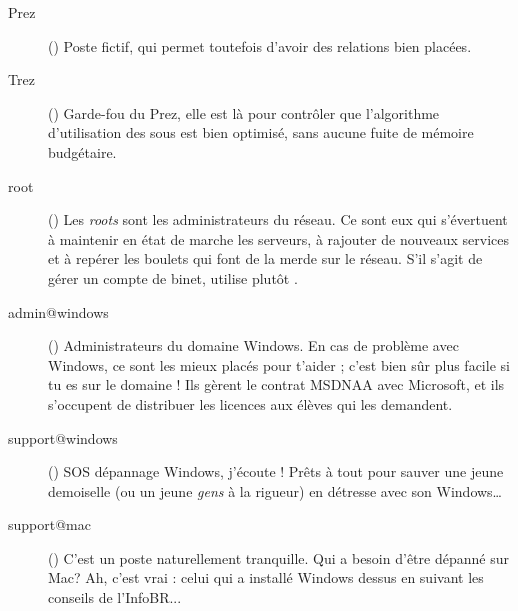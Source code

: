 \begin{description}

  \item[Prez]{() Poste fictif, qui permet toutefois d'avoir
des relations bien plac\'ees.}

  \item[Trez]{() Garde-fou du Prez, elle est là pour contrôler que l'algorithme d'utilisation des sous est bien optimisé, sans aucune fuite de mémoire budgétaire.}


  \item[root]{() Les \emph{roots} sont les administrateurs du r\'eseau. Ce sont eux qui s'\'evertuent \`a maintenir en \'etat de marche les serveurs, \`a rajouter de nouveaux services et \`a rep\'erer les boulets qui font de la merde sur le r\'eseau. S'il s'agit de g\'erer un compte de binet, utilise plut\^ot .}

  \item[admin@windows] {() Administrateurs du domaine Windows. En cas de probl\`eme avec Windows, ce sont les mieux plac\'es pour t'aider ; c'est bien s\^ur  plus facile si tu es sur le domaine ! Ils gèrent le contrat
MSDNAA avec Microsoft, et ils s'occupent de distribuer les licences
aux élèves qui les demandent.}
  \item[support@windows] {() SOS d\'epannage Windows, j'\'ecoute ! Pr\^ets \`a tout pour sauver une jeune demoiselle (ou un jeune \emph{gens} \`a la rigueur) en d\'etresse avec son Windows\dots }

  \item[support@mac] {() C'est un poste naturellement tranquille. Qui a besoin d'\^etre d\'epann\'e sur Mac? Ah, c'est vrai : celui qui a install\'e Windows dessus en suivant les conseils de l'InfoBR... }




\end{description}
